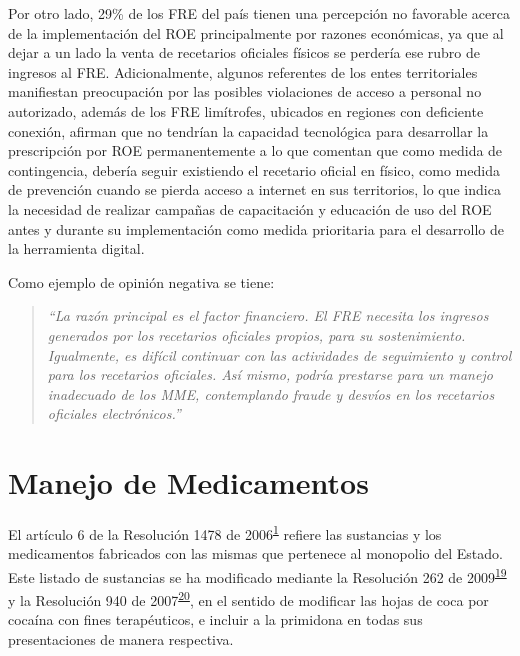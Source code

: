 \documentclass[
]{book}
\begin{document}
Por otro lado, 29\% de los FRE del país tienen una percepción no favorable acerca de la implementación del ROE principalmente por razones económicas, ya que al dejar a un lado la venta de recetarios oficiales físicos se perdería ese rubro de ingresos al FRE. Adicionalmente, algunos referentes de los entes territoriales manifiestan preocupación por las posibles violaciones de acceso a personal no autorizado, además de los FRE limítrofes, ubicados en regiones con deficiente conexión, afirman que no tendrían la capacidad tecnológica para desarrollar la prescripción por ROE permanentemente a lo que comentan que como medida de contingencia, debería seguir existiendo el recetario oficial en físico, como medida de prevención cuando se pierda acceso a internet en sus territorios, lo que indica la necesidad de realizar campañas de capacitación y educación de uso del ROE antes y durante su implementación como medida prioritaria para el desarrollo de la herramienta digital.

Como ejemplo de opinión negativa se tiene:

\begin{quote}
\emph{``La razón principal es el factor financiero. El FRE necesita los ingresos generados por los recetarios oficiales propios, para su sostenimiento. Igualmente, es difícil continuar con las actividades de seguimiento y control para los recetarios oficiales. Así mismo, podría prestarse para un manejo inadecuado de los MME, contemplando fraude y desvíos en los recetarios oficiales electrónicos.''}
\end{quote}

\hypertarget{manejo-de-medicamentos}{%
\chapter{Manejo de Medicamentos}\label{manejo-de-medicamentos}}


El artículo 6 de la Resolución 1478 de 2006\textsuperscript{\protect\hyperlink{ref-MSPS1478-2006}{1}} refiere las sustancias y los medicamentos fabricados con las mismas que pertenece al monopolio del Estado. Este listado de sustancias se ha modificado mediante la Resolución 262 de 2009\textsuperscript{\protect\hyperlink{ref-MSPS262-2009}{19}} y la Resolución 940 de 2007\textsuperscript{\protect\hyperlink{ref-MSPS940-2007}{20}}, en el sentido de modificar las hojas de coca por cocaína con fines terapéuticos, e incluir a la primidona en todas sus presentaciones de manera respectiva.
\end{document}
